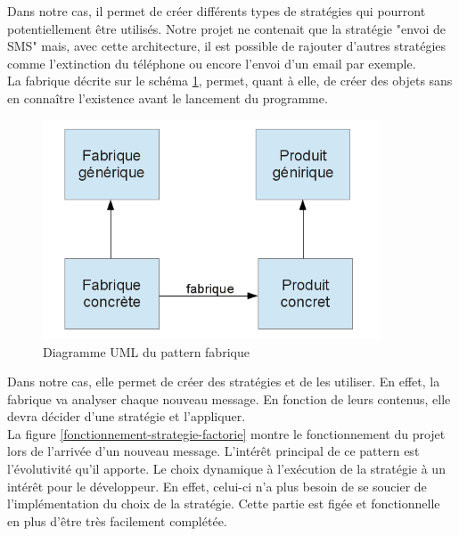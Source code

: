 Dans notre cas, il permet de créer différents types de stratégies qui pourront potentiellement être utilisés. 
Notre projet ne contenait que la stratégie "envoi de SMS" mais, avec cette architecture, il est possible 
de rajouter d'autres stratégies comme l'extinction du téléphone ou encore l'envoi d'un email par exemple.
\\
 
 
La fabrique décrite sur le schéma \ref{fabrique}, permet, quant à elle, de créer des objets sans en connaître l'existence avant le lancement du programme.
 
\begin{figure}[H]
  \center
  \includegraphics[width=10cm]{img/fabrique.png}
  \caption{Diagramme UML du pattern fabrique}
  \label{fabrique}
\end{figure}
 
Dans notre cas, elle permet de créer des stratégies et de les utiliser. En effet, la fabrique 
va analyser chaque nouveau message. En fonction de leurs contenus, elle devra décider d'une stratégie
et l'appliquer.
\\
 
La figure \ref{fonctionnement-strategie-factorie} montre le fonctionnement du projet lors de l'arrivée d'un
nouveau message. L'intérêt principal de ce pattern est l'évolutivité qu'il apporte. Le choix dynamique à
l'exécution de la stratégie à un intérêt pour le développeur. En effet, celui-ci n'a plus besoin de se
soucier de l'implémentation du choix de la stratégie. Cette partie est figée et fonctionnelle en plus d'être très facilement complétée.
 
